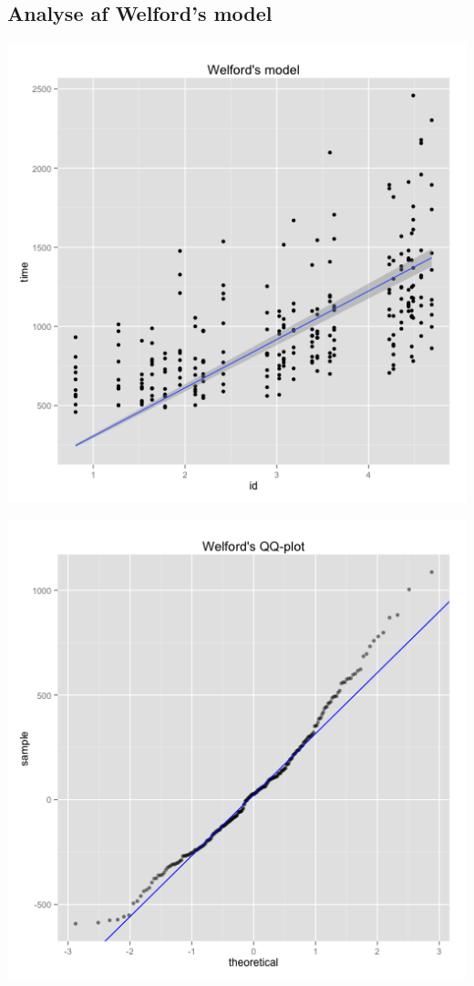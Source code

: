 \subsection*{Analyse af Welford's model}
\begin{minipage}{.5\textwidth}
	\centering
	\includegraphics[width=\textwidth]{images/plots/plot_model_welford}
	\label{fig:plot_model_welford}
\end{minipage}
\begin{minipage}{.5\textwidth}
	\centering
	\includegraphics[width=\textwidth]{images/plots/plot_qq_welford}
	\label{fig:plot_qq_welford}
\end{minipage}

